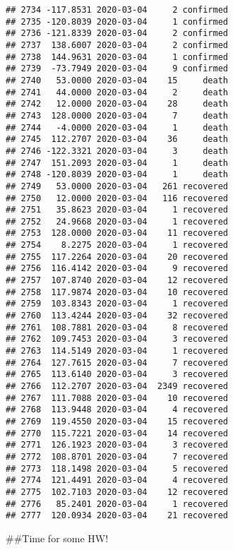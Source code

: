 \documentclass[
]{article}
\newenvironment{Shaded}{\begin{snugshade}}{\end{snugshade}}
\newcommand{\KeywordTok}[1]{\textcolor[rgb]{0.13,0.29,0.53}{\textbf{#1}}}
\newcommand{\NormalTok}[1]{#1}
\newcommand{\OperatorTok}[1]{\textcolor[rgb]{0.81,0.36,0.00}{\textbf{#1}}}
\newcommand{\StringTok}[1]{\textcolor[rgb]{0.31,0.60,0.02}{#1}}
\begin{document}
\begin{verbatim}
## 2734 -117.8531 2020-03-04     2 confirmed
## 2735 -120.8039 2020-03-04     1 confirmed
## 2736 -121.8339 2020-03-04     2 confirmed
## 2737  138.6007 2020-03-04     2 confirmed
## 2738  144.9631 2020-03-04     1 confirmed
## 2739  -73.7949 2020-03-04     9 confirmed
## 2740   53.0000 2020-03-04    15     death
## 2741   44.0000 2020-03-04     2     death
## 2742   12.0000 2020-03-04    28     death
## 2743  128.0000 2020-03-04     7     death
## 2744   -4.0000 2020-03-04     1     death
## 2745  112.2707 2020-03-04    36     death
## 2746 -122.3321 2020-03-04     3     death
## 2747  151.2093 2020-03-04     1     death
## 2748 -120.8039 2020-03-04     1     death
## 2749   53.0000 2020-03-04   261 recovered
## 2750   12.0000 2020-03-04   116 recovered
## 2751   35.8623 2020-03-04     1 recovered
## 2752   24.9668 2020-03-04     1 recovered
## 2753  128.0000 2020-03-04    11 recovered
## 2754    8.2275 2020-03-04     1 recovered
## 2755  117.2264 2020-03-04    20 recovered
## 2756  116.4142 2020-03-04     9 recovered
## 2757  107.8740 2020-03-04    12 recovered
## 2758  117.9874 2020-03-04    10 recovered
## 2759  103.8343 2020-03-04     1 recovered
## 2760  113.4244 2020-03-04    32 recovered
## 2761  108.7881 2020-03-04     8 recovered
## 2762  109.7453 2020-03-04     3 recovered
## 2763  114.5149 2020-03-04     1 recovered
## 2764  127.7615 2020-03-04     7 recovered
## 2765  113.6140 2020-03-04     3 recovered
## 2766  112.2707 2020-03-04  2349 recovered
## 2767  111.7088 2020-03-04    10 recovered
## 2768  113.9448 2020-03-04     4 recovered
## 2769  119.4550 2020-03-04    15 recovered
## 2770  115.7221 2020-03-04    14 recovered
## 2771  126.1923 2020-03-04     3 recovered
## 2772  108.8701 2020-03-04     7 recovered
## 2773  118.1498 2020-03-04     5 recovered
## 2774  121.4491 2020-03-04     4 recovered
## 2775  102.7103 2020-03-04    12 recovered
## 2776   85.2401 2020-03-04     1 recovered
## 2777  120.0934 2020-03-04    21 recovered
\end{verbatim}

\#\#Time for some HW!

\begin{Shaded}
\end{Shaded}
\end{document}
